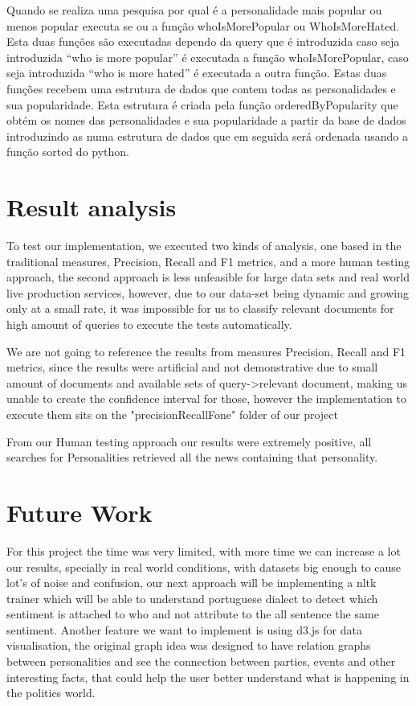 \documentclass{acm_proc_article-sp}
\begin{document}
Quando se realiza uma pesquisa por qual é a personalidade mais popular ou menos popular executa se ou a função whoIsMorePopular ou WhoIsMoreHated. 
Esta duas funções são executadas dependo da query que é introduzida caso seja introduzida “who is more popular” é executada a função whoIsMorePopular, caso seja introduzida “who is more hated” é executada a outra função. 
Estas duas funções recebem uma estrutura de dados que contem todas as personalidades e sua popularidade. 
Esta estrutura é criada pela função orderedByPopularity que obtém os nomes das personalidades e sua popularidade a partir da base de dados introduzindo as numa estrutura de dados que em seguida será ordenada usando a função sorted do python.






\section{Result analysis}
To test our implementation, we executed two kinds of analysis, one based in the traditional measures, Precision, Recall and F1 metrics, and a more human testing approach, the second approach is less unfeasible for large data sets and real world live production services, however, due to our data-set being dynamic and growing only at a small rate, it was impossible for us to classify relevant documents for high amount of queries to execute the tests automatically.

We are not going to reference the results from measures Precision, Recall and F1 metrics, since the results were artificial and not demonstrative due to small amount of documents and available sets of query->relevant document, making us unable to create the confidence interval for those, however the implementation to execute them sits on the "precisionRecallFone" folder of our project

From our Human testing approach our results were extremely positive, all searches for Personalities retrieved all the news containing that personality.

\section{Future Work}
For this project the time was very limited, with more time we can increase a lot our results, specially in real world conditions, with datasets big enough to cause lot's of noise and confusion, our next approach will be implementing a nltk trainer which will be able to understand portuguese dialect to detect which sentiment is attached to who and not attribute to the all sentence the same sentiment.
Another feature we want to implement is using d3.js for data visualisation, the original graph idea was designed to have relation graphs between personalities and see the connection between parties, events and other interesting facts, that could help the user better understand what is happening in the politics world.
\end{document}
